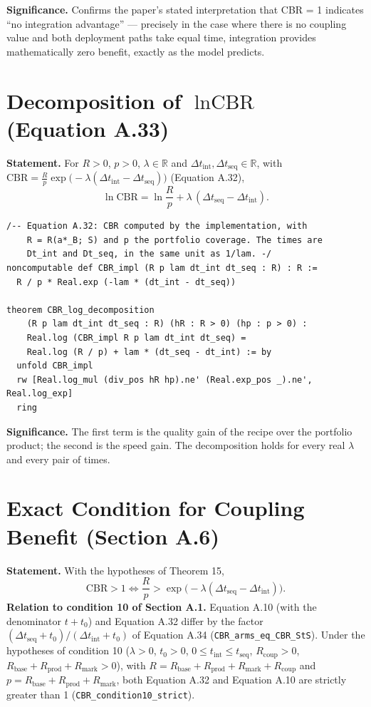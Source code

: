 \documentclass[11pt,a4paper]{article}
\begin{document}
	\noindent\textbf{Significance.} Confirms the paper's stated interpretation that CBR = 1 indicates ``no integration advantage'' --- precisely in the case where there is no coupling value and both deployment paths take equal time, integration provides mathematically zero benefit, exactly as the model predicts.
	
	\section{Decomposition of $\ln \text{CBR}$ (Equation A.33)}

	\textbf{Statement.} For $R>0$, $p>0$, $\lambda\in\mathbb{R}$ and $\Delta t_{\text{int}},\Delta t_{\text{seq}}\in\mathbb{R}$, with $\text{CBR}=\frac{R}{p}\exp\!\big(-\lambda(\Delta t_{\text{int}}-\Delta t_{\text{seq}})\big)$ (Equation A.32),
\begin{equation}
\ln \text{CBR} = \ln\frac{R}{p} + \lambda\,(\Delta t_{\text{seq}}-\Delta t_{\text{int}}).
\end{equation}

\begin{lstlisting}
/-- Equation A.32: CBR computed by the implementation, with
    R = R(a*_B; S) and p the portfolio coverage. The times are
    Dt_int and Dt_seq, in the same unit as 1/lam. -/
noncomputable def CBR_impl (R p lam dt_int dt_seq : R) : R :=
  R / p * Real.exp (-lam * (dt_int - dt_seq))

theorem CBR_log_decomposition
    (R p lam dt_int dt_seq : R) (hR : R > 0) (hp : p > 0) :
    Real.log (CBR_impl R p lam dt_int dt_seq) =
    Real.log (R / p) + lam * (dt_seq - dt_int) := by
  unfold CBR_impl
  rw [Real.log_mul (div_pos hR hp).ne' (Real.exp_pos _).ne', Real.log_exp]
  ring
\end{lstlisting}

	\noindent\textbf{Significance.} The first term is the quality gain of the recipe over the portfolio product; the second is the speed gain. The decomposition holds for every real $\lambda$ and every pair of times.

	\section{Exact Condition for Coupling Benefit (Section A.6)}

	\textbf{Statement.} With the hypotheses of Theorem 15,
\begin{equation}
\text{CBR} > 1 \iff \frac{R}{p} > \exp\!\big(-\lambda(\Delta t_{\text{seq}}-\Delta t_{\text{int}})\big).
\end{equation}
\textbf{Relation to condition 10 of Section A.1.} Equation A.10 (with the denominator $t+t_0$) and Equation A.32 differ by the factor $(\Delta t_{\text{seq}}+t_0)/(\Delta t_{\text{int}}+t_0)$ of Equation A.34 (\texttt{CBR\_arms\_eq\_CBR\_StS}). Under the hypotheses of condition 10 ($\lambda>0$, $t_0>0$, $0\le t_{\text{int}}\le t_{\text{seq}}$, $R_{\text{coup}}>0$, $R_{\text{base}}+R_{\text{prod}}+R_{\text{mark}}>0$), with $R=R_{\text{base}}+R_{\text{prod}}+R_{\text{mark}}+R_{\text{coup}}$ and $p=R_{\text{base}}+R_{\text{prod}}+R_{\text{mark}}$, both Equation A.32 and Equation A.10 are strictly greater than 1 (\texttt{CBR\_condition10\_strict}).
\end{document}
